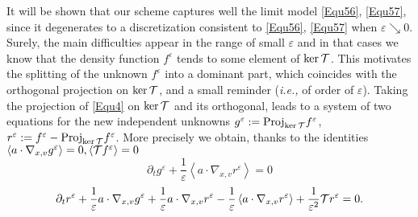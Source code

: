 \documentclass[12pt, a4paper]{article}
\newcommand{\red}{\textcolor{red!95!black}}
\newcommand{\eps}[0]{
\varepsilon}
\newcommand{\fe}[0]{
f ^\varepsilon}
\newcommand{\re}[0]{
r ^\varepsilon}
\newcommand{\geps}[0]{
g ^\varepsilon}
\newcommand{\nxv}[0]{
\nabla_{x,v}}
\newcommand{\ave}[1]{
\left \langle #1 \right \rangle }
\begin{document}
It will be shown that our scheme captures well the limit model \eqref{Equ56}, \eqref{Equ57}, since it degenerates to a discretization consistent to \eqref{Equ56}, \eqref{Equ57} when $\eps \searrow 0$. Surely, the main difficulties appear in the range of small $\eps$ and in that cases we know that the density function $\fe$ tends to some element of $\ker {\cal T}$. This motivates the splitting of the unknown $\fe$ into a dominant part, which coincides with the orthogonal projection on $\ker {\cal T}$, and a small reminder ({\it i.e.,} of order of $\eps$). Taking the projection of \eqref{Equ4} on $\ker {\cal T}$ and its orthogonal, leads to a system of two equations for the new independent unknowns $\geps :=\mathrm{Proj}_{\ker {\cal T}} \fe$, $\re :=\fe - \mathrm{Proj}_{\ker {\cal T}} \fe$. 
\red{More precisely we obtain, thanks to the identities $\ave{a \cdot \nxv \geps} = 0, \ave{{\cal T}\fe } = 0$
\begin{equation}
\label{EquIntro3} \partial _t \geps + \frac{1}{\eps} \ave{ a \cdot \nxv \re} = 0
\end{equation}
\begin{equation}
\label{EquIntro4} \partial _t \re + \frac{1}{\eps} a \cdot \nxv \geps + \frac{1}{\eps} a \cdot \nxv \re - \frac{1}{\eps} \ave{a \cdot \nxv \re} + \frac{1}{\eps ^2} {\cal T} \re = 0.
\end{equation}
}
\end{document}
